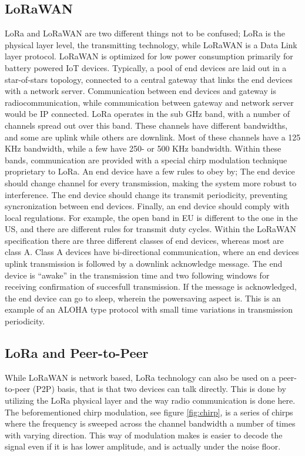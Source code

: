 \subsection{LoRaWAN}
LoRa and LoRaWAN are two different things not to be confused; LoRa is the physical layer level, the transmitting technology, while LoRaWAN is a Data Link layer protocol. LoRaWAN is optimized for low power consumption primarily for battery powered IoT devices. Typically, a pool of end devices are laid out in a star-of-stars topology, connected to a central gateway that links the end devices with a network server. Communication between end devices and gateway is radiocommunication, while communication between gateway and network server would be IP connected\cite{datalink}. LoRa operates in the sub GHz band, with a number of channels spread out over this band. These channels have different bandwidths, and some are uplink while others are downlink. Most of these channels have a 125 KHz bandwidth, while a few have 250- or 500 KHz bandwidth. Within these bands, communication are provided with a special chirp modulation technique proprietary to LoRa\cite{LPWAN}. An end device have a few rules to obey by; The end device should change channel for every transmission, making the system more robust to interference. The end device should change its transmit periodicity, preventing syncronization between end devices. Finally, an end device should comply with local regulations. For example, the open band in EU is different to the one in the US, and there are different rules for transmit duty cycles. Within the LoRaWAN specification there are three different classes of end devices, whereas most are class A. Class A devices have bi-directional communication, where an end devices uplink transmission is followed by a downlink acknowledge message. The end device is ``awake'' in the transmission time and two following windows for receiving confirmation of succesfull transmission. If the message is acknowledged, the end device can go to sleep, wherein the powersaving aspect is. This is an example of an ALOHA type protocol with small time variations in transmission periodicity\cite{datalink}.

\subsection{LoRa and Peer-to-Peer}
While LoRaWAN is network based, LoRa technology can also be used on a peer-to-peer (P2P) basis, that is that two devices can talk directly. This is done by utilizing the LoRa physical layer and the way radio communication is done here. The beforementioned chirp modulation, see figure \ref{fig:chirp}, is a series of chirps where the frequency is sweeped across the channel bandwidth a number of times with varying direction. This way of modulation makes is easier to decode the signal even if it is has lower amplitude, and is actually under the noise floor\cite{LPWAN}\cite{nordal}.\\

